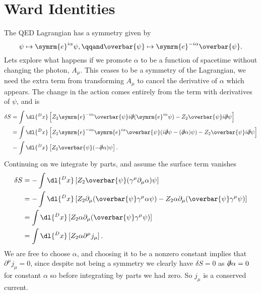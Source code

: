 \documentclass[fleqn]{NotesClass}
\newcommand{\e}{\symrm{e}}
\newcommand{\diracadjoint}[1]{\overbar{#1}}
\begin{document}
    \section{Ward Identities}
    The QED Lagrangian has a symmetry given by
    \begin{equation}
        \psi \mapsto \e^{i\alpha}\psi, \qqand \diracadjoint{\psi} \mapsto \e^{-i\alpha}\diracadjoint{\psi}.
    \end{equation}
    Lets explore what happens if we promote \(\alpha\) to be a function of spacetime without changing the photon, \(A_\mu\).
    This ceases to be a symmetry of the Lagrangian, we need the extra term from transforming \(A_\mu\) to cancel the derivative of \(\alpha\) which appears.
    The change in the action comes entirely from the term with derivatives of \(\psi\), and is
    \begin{align}
        \delta S &= \int \dl{^Dx} \left[ Z_2 \e^{-i\alpha}\diracadjoint{\psi}i\slashed{\partial}(\e^{i\alpha}\psi) - Z_2 \diracadjoint{\psi}i\slashed{\partial}\psi \right]\\
        &= \int \dl{^Dx} \left[ Z_2 \e^{-i\alpha}\e^{i\alpha}\diracadjoint{\psi}(i\slashed{\partial}\psi - (\slashed{\partial}\alpha)\psi) - Z_2\diracadjoint{\psi}i\slashed{\partial}\psi \right]\\
        &= \int \dl{^Dx}\left[ Z_2 \diracadjoint{\psi}(-\slashed{\partial}\alpha) \psi \right].
    \end{align}
    Continuing on we integrate by parts, and assume the surface term vanishes
    \begin{align}
        \delta S &= -\int \dl{^Dx} \left[ Z_2 \diracadjoint{\psi}(\gamma^\mu \partial_\mu \alpha)\psi \right]\\
        &= -\int \dl{^Dx} \left[ Z_2 \partial_\mu (\diracadjoint{\psi}\gamma^\mu \alpha \psi) - Z_2 \alpha \partial_\mu (\diracadjoint{\psi} \gamma^\mu \psi) \right]\\
        &= \int \dl{^Dx} \left[ Z_2 \alpha \partial_\mu (\diracadjoint{\psi} \gamma^\mu \psi) \right]\\
        &= \int \dl{^Dx} \left[ Z_2 \alpha \partial^\mu j_\mu \right].
    \end{align}
    We are free to choose \(\alpha\), and choosing it to be a nonzero constant implies that \(\partial^\mu j_\mu = 0\), since despite not being a symmetry we clearly have \(\delta S = 0\) as \(\slashed{\partial} \alpha = 0\) for constant \(\alpha\) so before integrating by parts we had zero.
    So \(j_\mu\) is a conserved current.
    
\end{document}
